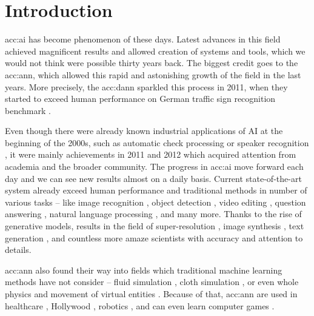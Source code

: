 \chapter{Introduction}
\label{chap:intro}

\acrfull{acc:ai} has become phenomenon of these days. Latest advances in this field achieved magnificent results and allowed creation of systems and tools, which we would not think were possible thirty years back. The biggest credit goes to the \acrfull{acc:ann}, which allowed this rapid and astonishing growth of the field in the last years. More precisely, the \acrfull{acc:dann} sparkled this process in 2011, when they started to exceed human performance on German traffic sign recognition benchmark \citep{CIRESAN2012333}.

Even though there were already known industrial applications of AI at the beginning of the 2000s, such as automatic check processing \citep{ChecksDocumentRecognition} or speaker recognition \citep{HECK2000181}, it were mainly achievements in 2011 and 2012 which acquired attention from academia and the broader community. The progress in \acrshort{acc:ai} move forward each day and we can see new results almost on a daily basis. Current state-of-the-art system already exceed human performance and traditional methods in number of various tasks -- like 
image recognition \citep{pham2021meta}\citep{ZawadzkaGosk2019},
object detection \citep{ghiasi2020simple}\citep{lehner2019patch},
video editing \citep{lu2020layered},
question answering \citep{yamada2020luke}\citep{yamada2020luke},
natural language processing \citep{gpt3},
and many more. Thanks to the rise of generative models, results in the field of
super-resolution \citep{Sun_2020}\allowbreak\citep{Chadha_2020},
image synthesis \citep{StateOfTheArtImageSythesis}\allowbreak\citep{esser2020taming}\allowbreak\citep{dalle},
text generation \citep{gpt3}\allowbreak\citep{malmi2019encode},
and countless more amaze scientists with accuracy and attention to details.

\acrshort{acc:ann} also found their way into fields which traditional machine learning methods have not consider -- fluid simulation \citep{um2018liquid}\citep{Kim_2019}, cloth simulation \citep{lee2019efficient}\citep{SRBO20}, or even whole physics \citep{PhysicsSimulation}\citep{sanchezgonzalez2020learning} and movement of virtual entities \citep{PhysicsBasedCharaterSImulation}\citep{zhang2020vid2player}. Because of that, \acrshort{acc:ann} are used in 
healthcare \citep{fakoor2013using}\allowbreak\citep{BreastCancerAISystem},
Hollywood \citep{aiinhollywood},
robotics \citep{pierson2017deep}\allowbreak\citep{Lee_2020},
and can even learn computer games \citep{openai2019dota}\allowbreak\citep{alphastar}.


